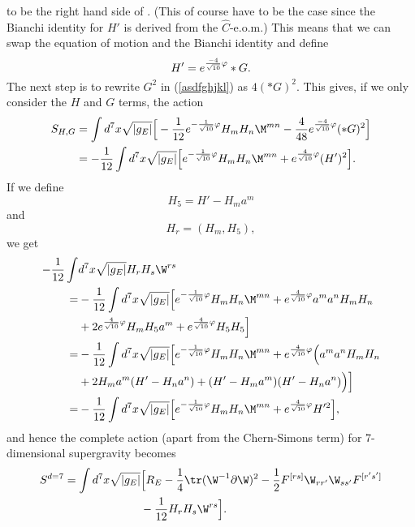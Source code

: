 to be the right hand side of . (This of course have to be the case since the Bianchi identity for $H'$ is derived from the $\hat{C}$-e.o.m.) 
This means that we can swap the equation of motion and the Bianchi identity and define
\begin{equation}
H'=e^{{-4 \over \sqrt{10}}\varphi}*G.
\end{equation}
The next step is to rewrite $G^2$ in (\ref{asdfghjkl}) as $4(*G)^2$. This gives, if we only consider the $H$ and $G$ terms, the action
\begin{align}
S_{H,G} &= \int d^7x \sqrt{|g_E|} \Big{[} -{1 \over 12}e^{-{1 \over \sqrt{10}} \varphi}H_mH_n\M^{mn} - {4 \over 48}e^{{-4 \over \sqrt{10}}\varphi}(*G)^2 \Big{]} \nonumber \\
&= -{1 \over 12} \int d^7x \sqrt{|g_E|} \Big{[} e^{-{1 \over \sqrt{10}} \varphi}H_mH_n\M^{mn} + e^{{4 \over \sqrt{10}}\varphi}(H')^2 \Big{]}.
\end{align}
If we define
\begin{equation}
H_5 = H' - H_m a^m
\label{h5}
\end{equation}
and
\begin{equation}
H_r = (H_m,H_5),
\end{equation}
we get
\begin{align}
-{1 \over 12} \int & d^7x \sqrt{|g_E|} H_r H_s \W^{rs}  \nonumber \\
=& -{1 \over 12} \int d^7x \sqrt{|g_E|} \Big{[} e^{-{1 \over \sqrt{10}} \varphi}H_mH_n\M^{mn} + e^{{4 \over \sqrt{10}} \varphi}a^m a^n H_m H_n \nonumber \\
& +2e^{{4 \over \sqrt{10}} \varphi}H_mH_5a^m +e^{{4 \over \sqrt{10}} \varphi}H_5H_5 \Big{]} \nonumber \\
=& -{1 \over 12} \int d^7x \sqrt{|g_E|} \Big{[} e^{-{1 \over \sqrt{10}} \varphi}H_mH_n\M^{mn} + e^{{4 \over \sqrt{10}} \varphi}\Big{(}a^m a^n H_m H_n \nonumber \\
& +2H_ma^m(H'-H_na^n) + (H'-H_ma^m)(H'-H_na^n) \Big{)}\Big{]} \nonumber \\
=& -{1 \over 12} \int d^7x \sqrt{|g_E|} \Big{[} e^{-{1 \over \sqrt{10}} \varphi}H_mH_n\M^{mn} + e^{{4 \over \sqrt{10}} \varphi}H'^2 \Big{]},
\end{align}
and hence the complete action (apart from the Chern-Simons term) for 7-dimensional supergravity becomes
\begin{align}
S^{d=7} = \int d^7x \sqrt{|g_E|} &\Big{[} R_E - \frac{1}{4}\tr(\W^{-1}\partial \W)^2 - {1 \over 2}F^{[rs]}\W_{rr'}\W_{ss'}F^{[r's']}\nonumber\\ 
& - {1 \over 12}H_r H_s \W^{rs} \Big{]}.
\end{align}
